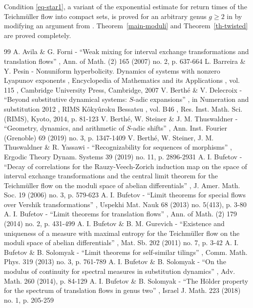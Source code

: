 \documentclass[11pt]{article}
\numberwithin{equation}{section}\newcommand{\Relation}[2][]{}\newtheorem*{prop*}{Proposition}
\theoremstyle{plain}
\theoremstyle{definition}
\begin{document}
Condition \eqref{eq-star1}, a variant of the exponential estimate for return times of the Teichmüller flow into compact sets, is proved for an arbitrary genus $g\ge 2$ in \cite[Prop.\,11.3]{BuSo18a} by modifying an
argument from \cite{buf-jams}. Theorem~\ref{main-moduli} and Theorem~\ref{th-twisted} are proved completely.



\begin{thebibliography}{99}
 A. Avila \& G. Forni - “Weak mixing for interval exchange transformations and translation flows” , Ann. of Math. (2) 165 (2007) no. 2, p. 637-664
 L. Barreira \& Y. Pesin - Nonuniform hyperbolicity. Dynamics of systems with nonzero Lyapunov exponents , Encyclopedia of Mathematics and its Applications , vol. 115 , Cambridge University Press, Cambridge, 2007
 V. Berthé \& V. Delecroix - “Beyond substitutive dynamical systems: $S$-adic expansions” , in Numeration and substitution 2012 , RIMS Kôkyûroku Bessatsu , vol. B46 , Res. Inst. Math. Sci. (RIMS), Kyoto, 2014, p. 81-123
 V. Berthé, W. Steiner \& J. M. Thuswaldner - “Geometry, dynamics, and arithmetic of $S$-adic shifts” , Ann. Inst. Fourier (Grenoble) 69 (2019) no. 3, p. 1347-1409
 V. Berthé, W. Steiner, J. M. Thuswaldner \& R. Yassawi - “Recognizability for sequences of morphisms” , Ergodic Theory Dynam. Systems 39 (2019) no. 11, p. 2896-2931
 A. I. Bufetov - “Decay of correlations for the Rauzy-Veech-Zorich induction map on the space of interval exchange transformations and the central limit theorem for the Teichmüller flow on the moduli space of abelian differentials” , J. Amer. Math. Soc. 19 (2006) no. 3, p. 579-623
 A. I. Bufetov - “Limit theorems for special flows over Vershik transformations” , Uspekhi Mat. Nauk 68 (2013) no. 5(413), p. 3-80
 A. I. Bufetov - “Limit theorems for translation flows” , Ann. of Math. (2) 179 (2014) no. 2, p. 431-499
 A. I. Bufetov \& B. M. Gurevich - “Existence and uniqueness of a measure with maximal entropy for the Teichmüller flow on the moduli space of abelian differentials” , Mat. Sb. 202 (2011) no. 7, p. 3-42
 A. I. Bufetov \& B. Solomyak - “Limit theorems for self-similar tilings” , Comm. Math. Phys. 319 (2013) no. 3, p. 761-789
 A. I. Bufetov \& B. Solomyak - “On the modulus of continuity for spectral measures in substitution dynamics” , Adv. Math. 260 (2014), p. 84-129
 A. I. Bufetov \& B. Solomyak - “The Hölder property for the spectrum of translation flows in genus two” , Israel J. Math. 223 (2018) no. 1, p. 205-259

\end{thebibliography}
\end{document}
